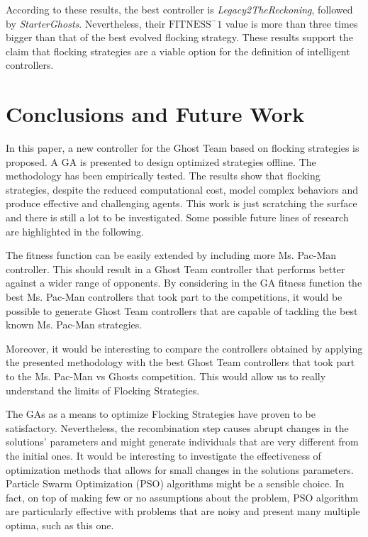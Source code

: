 \documentclass{llncs}
\begin{document}
According to these results, the best controller is \textit{Legacy2TheReckoning}, followed by  \textit{StarterGhosts}. Nevertheless, their $\mathrm{FITNESS}^-1$ value is more than three times bigger than that of the best evolved flocking strategy. These results support the claim that flocking strategies are a viable option for the definition of intelligent controllers.

%
%

\section{Conclusions and Future Work}
\label{sec:conclusions}

In this paper, a new controller for the Ghost Team based on flocking strategies is proposed. A GA is presented to design optimized strategies offline. The methodology has been empirically tested. The results show that flocking strategies, despite the reduced computational cost, model complex behaviors and produce effective and challenging agents. This work is just scratching the surface and there is still a lot to be investigated. Some possible future lines of research are highlighted in the following.

The fitness function can be easily extended by including more Ms. Pac-Man controller. This should result in a Ghost Team controller that performs better against a wider range of opponents. By considering in the GA fitness function the best Ms. Pac-Man controllers that took part to the competitions, it would be possible to generate Ghost Team controllers that are capable of tackling the best known Ms. Pac-Man strategies.

Moreover, it would be interesting to compare the controllers obtained by applying the presented methodology with the best Ghost Team controllers that took part to the Ms. Pac-Man vs Ghosts competition. This would allow us to really understand the limits of Flocking Strategies.

The GAs as a means to optimize Flocking Strategies have proven to be satisfactory. Nevertheless, the recombination step causes abrupt changes in the solutions' parameters and might generate individuals that are very different from the initial ones. It would be interesting to investigate the effectiveness of optimization methods that allows for small changes in the solutions parameters. Particle Swarm Optimization (PSO) algorithms  might be a sensible choice. In fact, on top of making few or no assumptions about the problem, PSO algorithm are particularly effective with problems that are noisy and present many multiple optima, such as this one.
\end{document}

